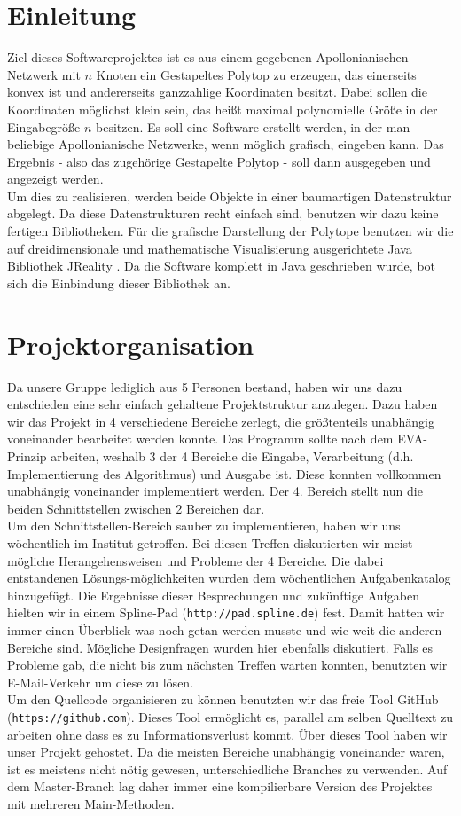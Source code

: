 \section*{Einleitung}
Ziel dieses Softwareprojektes ist es aus einem gegebenen Apollonianischen Netzwerk mit $n$ Knoten ein Gestapeltes Polytop zu erzeugen, das einerseits konvex ist und andererseits ganzzahlige Koordinaten besitzt. Dabei sollen die Koordinaten möglichst klein sein, das heißt maximal polynomielle Größe in der Eingabegröße $n$ besitzen. Es soll eine Software erstellt werden, in der man beliebige Apollonianische Netzwerke, wenn möglich grafisch, eingeben kann. Das Ergebnis - also das zugehörige Gestapelte Polytop - soll dann ausgegeben und angezeigt werden.\\
Um dies zu realisieren, werden beide Objekte in einer baumartigen Datenstruktur abgelegt. Da diese Datenstrukturen recht einfach sind, benutzen wir dazu keine fertigen Bibliotheken. Für die grafische Darstellung der Polytope benutzen wir die auf dreidimensionale und mathematische Visualisierung ausgerichtete Java Bibliothek JReality \cite{jreality}. Da die Software komplett in Java geschrieben wurde, bot sich die Einbindung dieser Bibliothek an.

\section*{Projektorganisation}
Da unsere Gruppe lediglich aus 5 Personen bestand, haben wir uns dazu entschieden eine sehr einfach gehaltene Projektstruktur anzulegen. Dazu haben wir das Projekt in 4 verschiedene Bereiche zerlegt, die größtenteils unabhängig voneinander bearbeitet werden konnte. Das Programm sollte nach dem EVA-Prinzip arbeiten, weshalb 3 der 4 Bereiche die Eingabe, Verarbeitung (d.h. Implementierung des Algorithmus) und Ausgabe ist. Diese konnten vollkommen unabhängig voneinander implementiert werden. Der 4. Bereich stellt nun die beiden Schnittstellen zwischen 2 Bereichen dar.\\
Um den Schnittstellen-Bereich sauber zu implementieren, haben wir uns wöchentlich im Institut getroffen. Bei diesen Treffen diskutierten wir meist mögliche Herangehensweisen und Probleme der 4 Bereiche. Die dabei entstandenen Lösungs-möglichkeiten wurden dem wöchentlichen Aufgabenkatalog hinzugefügt. Die Ergebnisse dieser Besprechungen und zukünftige Aufgaben hielten wir in einem Spline-Pad (\texttt{http://pad.spline.de}) fest. Damit hatten wir immer einen Überblick was noch getan werden musste und wie weit die anderen Bereiche sind. Mögliche Designfragen wurden hier ebenfalls diskutiert. Falls es Probleme gab, die nicht bis zum nächsten Treffen warten konnten, benutzten wir E-Mail-Verkehr um diese zu lösen.\\
Um den Quellcode organisieren zu können benutzten wir das freie Tool GitHub (\texttt{https://github.com}). Dieses Tool ermöglicht es, parallel am selben Quelltext zu arbeiten ohne dass es zu Informationsverlust kommt. Über dieses Tool haben wir unser Projekt gehostet. Da die meisten Bereiche unabhängig voneinander waren, ist es meistens nicht nötig gewesen, unterschiedliche Branches zu verwenden. Auf dem Master-Branch lag daher immer eine kompilierbare Version des Projektes mit mehreren Main-Methoden.

